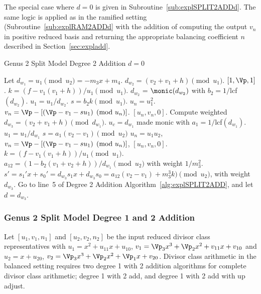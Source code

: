 The special case where $d=0$ is given in Subroutine~\ref{sub:explSPLIT2ADDd}.
The same logic is applied as in the ramified setting
(Subroutine~\ref{sub:explRAM2ADDd} with the addition of computing the output
$v_{n}$ in positive reduced basis and returning the appropriate balancing
coefficient $n$ described in Section~\ref{sec:expladd}.

\begin{subroutine}[htbp]
\caption{Genus 2 Split Model Degree 2 Addition $d = 0$ \label{sub:explSPLIT2ADDd}}
\begin{algorithmic} [1]
\State Let $d_{w_1} = u_1 \pmod{u_2} = -m_3x + m_4$.
    \State $d_{w_2} = (v_2 + v_1 + h) \pmod{u_1}$.
     \Return $[1,\Vp,1]$.
    \Else  
        \State $k = (f - v_1(v_1 + h))/u_1 \pmod{u_1}$.
        \State $d_{w_2}$ = $\monic(d_{w_2})$ with $b_2 = 1/$lcf$(d_{w_2})$.
        \State $u_1 = u_1/d_{w_2}$.
        \State $s = b_2k \pmod{u_1}$.
        \State $u_n = u_1^2$.
        \State $v_n = \Vp - [(\Vp - v_1 - su_1) \pmod{u_n}]$.
        \State \Return $[u_n,v_n,0]$.
    \EndIf
\Else 
    \State Compute weighted $d_{w_3} = (v_2 + v_1 + h) \pmod{d_{w_1}}$.
        \State $u_c = d_{w_1}$ made monic with $a_1 = 1/$lcf$(d_{w_1})$.
        \State $u_1 = u_1/d_{w_1}$
        \State $s = a_1(v_2 - v_1) \pmod{u_2}$
        \State $u_n = u_1u_2$, $v_n = \Vp - [(\Vp - v_1 - su_1) \pmod{u_n}]$, \Return $[u_n,v_n,0]$.
    \Else 
        \State $k = (f - v_1(v_1 + h))/u_1 \pmod{u_1}$.
        \State $a_{12} = (1 - b_2(v_1 + v_2 + h))/d_{w_1} \pmod{u_2}$ with weight $1/m_3^2$.
        \State $s' = s_1'x + s_0' = d_{w_3}s_1x + d_{w_3}s_0 = a_{12}(v_2 - v_1) + m_3^3k) \pmod{u_2}$, with weight $d_{w_3}$.
        \State Go to line~5 of Degree 2 Addition Algorithm~\ref{alg:explSPLIT2ADD}, and let $d = d_{w_3}$.
    \EndIf
\EndIf
\end{algorithmic}
\end{subroutine}


\subsubsection{Genus 2 Split Model Degree 1 and 2 Addition}
Let $[u_1,v_1,n_1]$ and $[u_2,v_2,n_2]$ be the input reduced divisor class
representatives with $u_1 = x^2 + u_{11}x + u_{10}$, $v_1 = \Vp_3x^3 + \Vp_2x^2
+ v_{11}x + v_{10}$ and $u_2 = x + u_{20}$, $v_2 = \Vp_3x^3 + \Vp_2x^2 + \Vp_1x
+ v_{20}$. Divisor class arithmetic in the balanced setting requires two degree
1 with 2 addition algorithms for complete divisor class arithmetic; degree 1
with 2 add, and degree 1 with 2 add with up adjust. 

